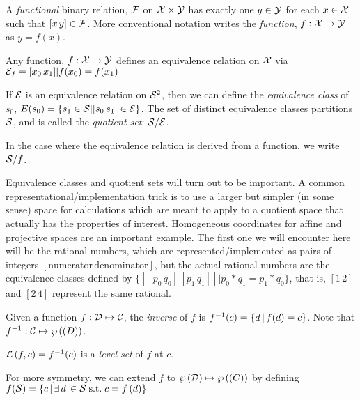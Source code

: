 
A \textit{functional} binary relation, $\mathcal{F}$ on $\mathcal{X}
\times \mathcal{Y}$ has exactly one $y \in \mathcal{Y}$ for each
$x \in \mathcal{X}$ such that $[x \, y] \in \mathcal{F}$.
More conventional notation writes the \textit{function}, 
$f : \mathcal{X} \rightarrow \mathcal{Y}$ as $y = f(x)$.

Any function, $f : \mathcal{X} \rightarrow \mathcal{Y}$ defines an
equivalence relation on $\mathcal{X}$ via 
$\mathcal{E}_f = {[x_0 \, x_1] | f(x_0) = f(x_1)}$


If $\mathcal{E}$ is an equivalence relation on $\mathcal{S}^2$, then we
can define the \textit{equivalence class} of $s_0$, $E(s_0) = \{
s_1 \in \mathcal{S} | [s_0 \, s_1] \in \mathcal{E} \}$.
The set of distinct equivalence classes partitions $\mathcal{S}$,
and is called the \textit{quotient set}: $\mathcal{S} / \mathcal{E}$.

In the case where the equivalence relation is derived from a
function, we write $\mathcal{S} / f$.

Equivalence classes and quotient sets will turn out to be
important. A common representational/implementation trick is to
use a larger but simpler (in some sense) space for calculations
which are meant to apply to a quotient space that actually has the
properties of interest. Homogeneous coordinates for affine and
projective spaces  are an important example.
The first one we will encounter here will be the rational numbers,
which are represented/implemented as pairs of integers
$[\text{numerator} \, \text{denominator}]$, but the actual
rational numbers are the equivalence classes defined by 
$\{ [[p_0 \, q_0] \, [p_1 \, q_1]] | p_0*q_1 = p_1*q_0 \}$,
that is, $[1 \, 2]$ and $[2 \, 4]$ represent the same rational.

\label{sec:Inverses-and-pseudo-inverses}

Given a function $f : \mathcal{D} \mapsto \mathcal{C}$,
the \textit{inverse} of $f$ is 
$f^{-1}(c) =  \left\{ d \, | \, f(d) = c \right\} $.
Note that $f^{-1} : \mathcal{C}  \mapsto  \wp \left( \mathcal{(}D) \right) $.

$\mathcal{L}\left( f , c \right) = f^{-1}(c)$ is a \textit{level set} of
$f$ at $c$.

For more symmetry, we can extend $f$ to 
$ \wp \left( \mathcal{D} \right)   \mapsto  \wp \left( \mathcal{(}C) \right) $
by defining
$f(\mathcal{S}) = 
 \left\{ c \, | \, \exists \, d \, \in \mathcal{S} \; \text{s.t.} \; c = f \left( d \right) \right\} $

